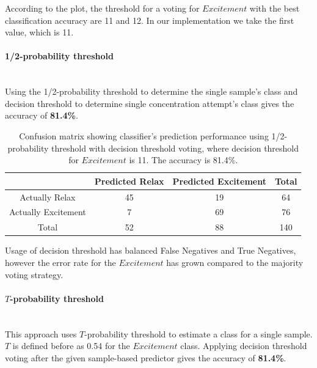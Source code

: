 \documentclass[12pt]{article}
\theoremstyle{definition}
\begin{document}
According to the plot, the threshold for a voting for $Excitement$ with the best classification accuracy are 11 and 12. In our implementation we take the first value, which is 11.

\paragraph{1/2-probability threshold}~\\

Using the 1/2-probability threshold to determine the single sample's class and decision threshold to determine single concentration attempt's class gives the accuracy of \textbf{81.4\%}.
\begin{table}[H]
\begin{center}
  \begin{tabular}{ | c | c | c | c | }
    \hline
     & Predicted Relax & Predicted Excitement & Total \\ \hline
    Actually Relax & 45 & 19 & 64 \\ \hline
    Actually Excitement & 7 & 69 & 76 \\ \hline
    Total & 52 & 88 & 140 \\ 
    \hline
  \end{tabular}
\end{center}
\caption{Confusion matrix showing classifier's prediction performance using 1/2-probability threshold with decision threshold voting, where decision threshold for $Excitement$ is 11. The accuracy is 81.4\%.} 
\end{table}

Usage of decision threshold has balanced False Negatives and True Negatives, however the error rate for the $Excitement$ has grown compared to the majority voting strategy.

\paragraph{$T$-probability threshold}~\\

This approach uses $T$-probability threshold to estimate a class for a single sample. $T$ is defined before as 0.54 for the $Excitement$ class. Applying decision threshold voting after the given sample-based predictor gives the accuracy of \textbf{81.4\%}.
\end{document}

